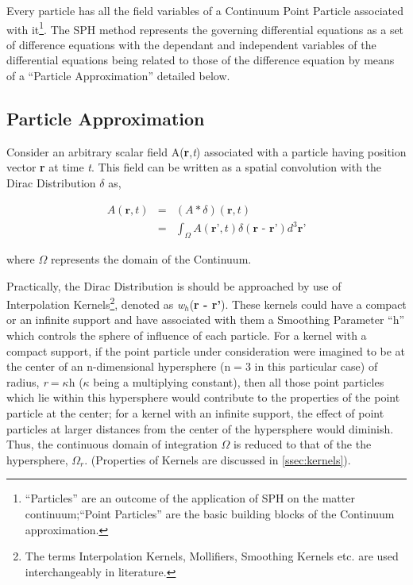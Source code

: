 Every particle has all the field variables of a Continuum Point Particle associated with it\footnote{``Particles'' are an outcome of the application of SPH on the matter continuum;``Point Particles'' are the basic building blocks of the Continuum approximation.}. The SPH method represents the governing differential equations as a set of difference equations with the dependant and independent variables of the differential equations being related to those of the difference equation by means of a ``Particle Approximation'' detailed below.

\subsection{Particle Approximation}\label{kappa}

Consider an arbitrary scalar field A(\textbf{r},\textit{t}) associated with a particle having position vector \textbf{r} at time \textit{t}. This field can be written as a spatial convolution with the Dirac Distribution $\delta$ as, 

\begin{eqnarray} \label{eq:dirac}
 A(\textbf{r},\textit{t}) &=& (A\ast \delta)(\textbf{r},t) \nonumber \\
                          &=& \int_{\varOmega} A(\textbf{r'},t) \delta (\textbf{r - r'}) d^{3}\textbf{r'} 
\end{eqnarray}

where $\varOmega$ represents the domain of the Continuum. 

Practically, the Dirac Distribution is should be approached by use of Interpolation Kernels\footnote{The terms Interpolation Kernels, Mollifiers, Smoothing Kernels etc. are used interchangeably in literature.}, denoted as \textit{w$_h$}(\textbf{r - r'}). These kernels could have a compact or an infinite support and have associated with them a Smoothing Parameter ``h'' which controls the sphere of influence of each particle. For a kernel with a compact support, if the point particle under consideration were imagined to be at the center of an n-dimensional hypersphere (n$=$3 in this particular case) of radius, \textit{r}$=\kappa$h ($\kappa$ being a multiplying constant), then all those point particles which lie within this hypersphere would contribute to the properties of the point particle at the center; for a kernel with an infinite support, the effect of point particles at larger distances from the center of the hypersphere would diminish. Thus, the continuous domain of integration $\varOmega$ is reduced to that of the the hypersphere, $\varOmega_r$. (Properties of Kernels are discussed in \ref{ssec:kernels}). 

